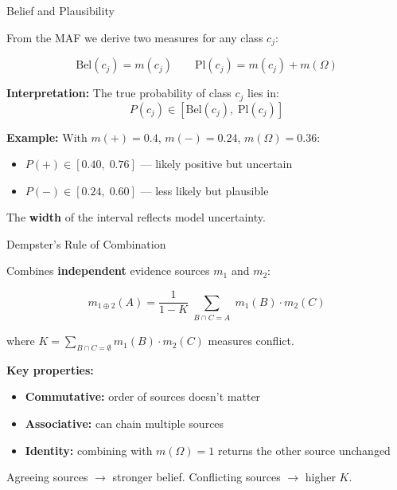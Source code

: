 \documentclass[aspectratio=169,12pt]{beamer}
\begin{document}
\begin{frame}{Belief and Plausibility}

From the MAF we derive two measures for any class $c_j$:

\vspace{1em}
$$\text{Bel}(c_j) = m(c_j) \qquad \text{Pl}(c_j) = m(c_j) + m(\Omega)$$

\vspace{1em}
\textbf{Interpretation:} The true probability of class $c_j$ lies in:
$$P(c_j) \in [\text{Bel}(c_j),\; \text{Pl}(c_j)]$$

\vspace{1em}
\textbf{Example:} With $m(+) = 0.4$, $m(-) = 0.24$, $m(\Omega) = 0.36$:
\begin{itemize}
    \item $P(+) \in [0.40,\; 0.76]$ --- likely positive but uncertain
    \item $P(-) \in [0.24,\; 0.60]$ --- less likely but plausible
\end{itemize}

\vspace{0.5em}
The \textbf{width} of the interval reflects model uncertainty.

\end{frame}

\begin{frame}{Dempster's Rule of Combination}

Combines \textbf{independent} evidence sources $m_1$ and $m_2$:

$$m_{1 \oplus 2}(A) = \frac{1}{1 - K}\sum_{\substack{B \cap C = A}} m_1(B) \cdot m_2(C)$$

\vspace{0.3em}
where $K = \sum_{B \cap C = \emptyset} m_1(B) \cdot m_2(C)$ measures conflict.

\vspace{1em}
\textbf{Key properties:}
\begin{itemize}
    \item \textbf{Commutative:} order of sources doesn't matter
    \item \textbf{Associative:} can chain multiple sources
    \item \textbf{Identity:} combining with $m(\Omega)=1$ returns the other source unchanged
\end{itemize}

\vspace{0.5em}
Agreeing sources $\rightarrow$ stronger belief. \quad Conflicting sources $\rightarrow$ higher $K$.

\end{frame}
\end{document}
